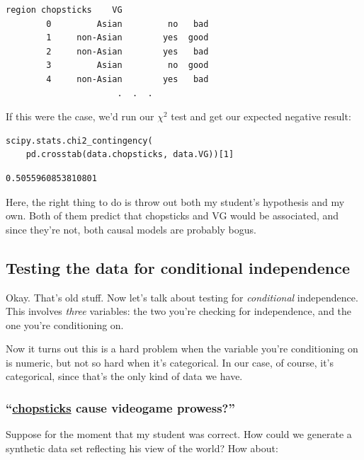\begin{Verbatim}[fontsize=\small,samepage=true,frame=leftline,framesep=5mm,framerule=1mm]
                 region chopsticks    VG
        0         Asian         no   bad
        1     non-Asian        yes  good
        2     non-Asian        yes   bad
        3         Asian         no  good
        4     non-Asian        yes   bad
                      .  .  .
\end{Verbatim}

If this were the case, we'd run our $\chi ^2$ test and get our expected
negative result:

\begin{Verbatim}[fontsize=\small,samepage=true,frame=single,framesep=3mm]
scipy.stats.chi2_contingency(
    pd.crosstab(data.chopsticks, data.VG))[1]
\end{Verbatim}
\vspace{-.2in}

\begin{Verbatim}[fontsize=\small,samepage=true,frame=leftline,framesep=5mm,framerule=1mm]
0.5055960853810801
\end{Verbatim}

Here, the right thing to do is throw out both my student's hypothesis and my
own. Both of them predict that \textsf{chopsticks} and \textsf{VG} would be
associated, and since they're not, both causal models are probably bogus.

\subsection{Testing the data for conditional independence}

Okay. That's old stuff. Now let's talk about testing for \textit{conditional}
independence. This involves \textit{three} variables: the two you're checking
for independence, and the one you're conditioning on. 

Now it turns out this is a hard problem when the variable you're conditioning
on is numeric, but not so hard when it's categorical. In our case, of course,
it's categorical, since that's the only kind of data we have.

\subsubsection{``\underline{chopsticks} cause videogame prowess?''}

Suppose for the moment that my student was correct. How could we generate a
synthetic data set reflecting his view of the world? How about:

